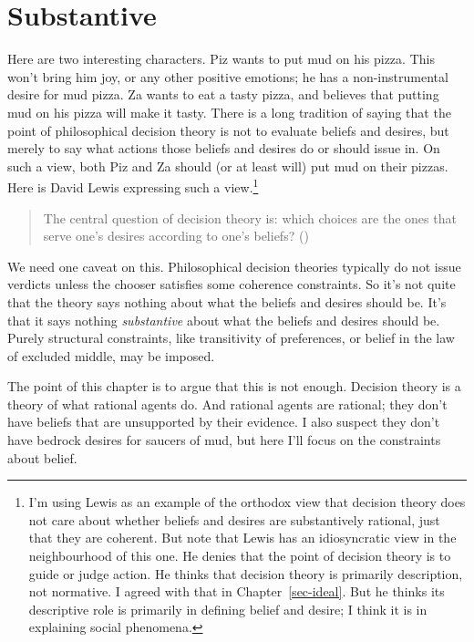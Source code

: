 \documentclass[
  12pt,
  letterpaper,
  DIV=11,
  numbers=noendperiod]{scrreprt}
\begin{document}

\chapter{Substantive}\label{sec-substantive}

Here are two interesting characters. Piz wants to put mud on his pizza.
This won't bring him joy, or any other positive emotions; he has a
non-instrumental desire for mud pizza. Za wants to eat a tasty pizza,
and believes that putting mud on his pizza will make it tasty. There is
a long tradition of saying that the point of philosophical decision
theory is not to evaluate beliefs and desires, but merely to say what
actions those beliefs and desires do or should issue in. On such a view,
both Piz and Za should (or at least will) put mud on their pizzas. Here
is David Lewis expressing such a view.\footnote{I'm using Lewis as an
  example of the orthodox view that decision theory does not care about
  whether beliefs and desires are substantively rational, just that they
  are coherent. But note that Lewis has an idiosyncratic view in the
  neighbourhood of this one. He denies that the point of decision theory
  is to guide or judge action. He thinks that decision theory is
  primarily description, not normative. I agreed with that in
  Chapter~\ref{sec-ideal}. But he thinks its descriptive role is
  primarily in defining belief and desire; I think it is in explaining
  social phenomena.}

\begin{quote}
The central question of decision theory is: which choices are the ones
that serve one's desires according to one's beliefs?
()
\end{quote}

We need one caveat on this. Philosophical decision theories typically do
not issue verdicts unless the chooser satisfies some coherence
constraints. So it's not quite that the theory says nothing about what
the beliefs and desires should be. It's that it says nothing
\emph{substantive} about what the beliefs and desires should be. Purely
structural constraints, like transitivity of preferences, or belief in
the law of excluded middle, may be imposed.

The point of this chapter is to argue that this is not enough. Decision
theory is a theory of what rational agents do. And rational agents are
rational; they don't have beliefs that are unsupported by their
evidence. I also suspect they don't have bedrock desires for saucers of
mud, but here I'll focus on the constraints about belief.
\end{document}
